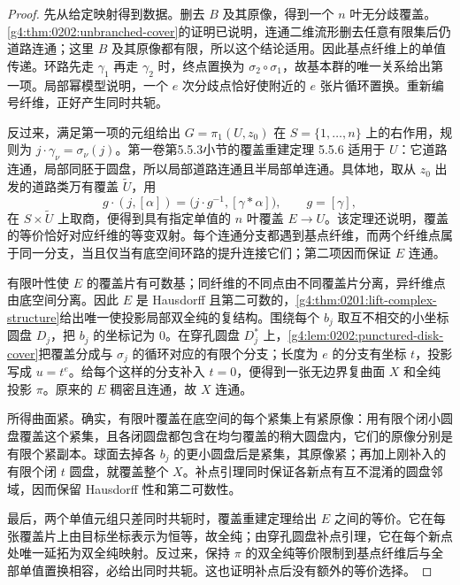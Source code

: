 \begin{proof}
	先从给定映射得到数据。删去 \(B\) 及其原像，得到一个 \(n\) 叶无分歧覆盖。\cref{g4:thm:0202:unbranched-cover}的证明已说明，连通二维流形删去任意有限集后仍道路连通；这里 \(B\) 及其原像都有限，所以这个结论适用。因此基点纤维上的单值传递。环路先走 \(\gamma_1\) 再走 \(\gamma_2\) 时，终点置换为 \(\sigma_2\circ\sigma_1\)，故基本群的唯一关系给出第一项。局部幂模型说明，一个 \(e\) 次分歧点恰好使附近的 \(e\) 张片循环置换。重新编号纤维，正好产生同时共轭。

	反过来，满足第一项的元组给出 \(G=\pi_1(U,z_0)\) 在 \(S=\{1,\ldots,n\}\) 上的右作用，规则为 \(j\cdot\gamma_\nu=\sigma_\nu(j)\)。第一卷第5.5.3小节的覆盖重建定理 5.5.6 适用于 \(U\)：它道路连通，局部同胚于圆盘，所以局部道路连通且半局部单连通。具体地，取从 \(z_0\) 出发的道路类万有覆盖 \(\widetilde U\)，用
	\[
		g\cdot(j,[\alpha])=
		\bigl(j\cdot g^{-1},[\gamma*\alpha]\bigr),
		\qquad g=[\gamma],
	\]
	在 \(S\times\widetilde U\) 上取商，便得到具有指定单值的 \(n\) 叶覆盖 \(E\to U\)。该定理还说明，覆盖的等价恰好对应纤维的等变双射。每个连通分支都遇到基点纤维，而两个纤维点属于同一分支，当且仅当有底空间环路的提升连接它们；第二项因而保证 \(E\) 连通。

	有限叶性使 \(E\) 的覆盖片有可数基；同纤维的不同点由不同覆盖片分离，异纤维点由底空间分离。因此 \(E\) 是 Hausdorff 且第二可数的，\cref{g4:thm:0201:lift-complex-structure}给出唯一使投影局部双全纯的复结构。围绕每个 \(b_j\) 取互不相交的小坐标圆盘 \(D_j\)，把 \(b_j\) 的坐标记为 \(0\)。在穿孔圆盘 \(D_j^*\) 上，\cref{g4:lem:0202:punctured-disk-cover}把覆盖分成与 \(\sigma_j\) 的循环对应的有限个分支；长度为 \(e\) 的分支有坐标 \(t\)，投影写成 \(u=t^e\)。给每个这样的分支补入 \(t=0\)，便得到一张无边界复曲面 \(X\) 和全纯投影 \(\pi\)。原来的 \(E\) 稠密且连通，故 \(X\) 连通。

	所得曲面紧。确实，有限叶覆盖在底空间的每个紧集上有紧原像：用有限个闭小圆盘覆盖这个紧集，且各闭圆盘都包含在均匀覆盖的稍大圆盘内，它们的原像分别是有限个紧副本。球面去掉各 \(b_j\) 的更小圆盘后是紧集，其原像紧；再加上刚补入的有限个闭 \(t\) 圆盘，就覆盖整个 \(X\)。补点引理同时保证各新点有互不混淆的圆盘邻域，因而保留 Hausdorff 性和第二可数性。

	最后，两个单值元组只差同时共轭时，覆盖重建定理给出 \(E\) 之间的等价。它在每张覆盖片上由目标坐标表示为恒等，故全纯；由穿孔圆盘补点引理，它在每个新点处唯一延拓为双全纯映射。反过来，保持 \(\pi\) 的双全纯等价限制到基点纤维后与全部单值置换相容，必给出同时共轭。这也证明补点后没有额外的等价选择。
\end{proof}

